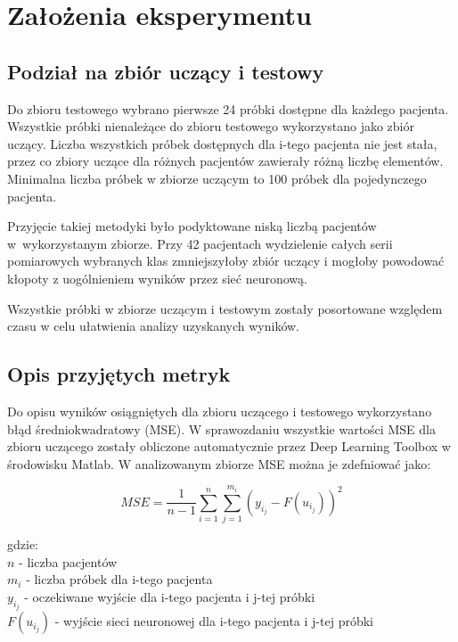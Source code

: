 \documentclass[12pt]{article}
\begin{document}
\newpage
\section{Założenia eksperymentu}

\subsection{Podział na zbiór uczący i testowy}
Do zbioru testowego wybrano pierwsze 24 próbki dostępne dla każdego pacjenta. Wszystkie próbki nienależące do zbioru testowego wykorzystano jako zbiór uczący. Liczba wszystkich próbek dostępnych dla i-tego pacjenta nie jest stała, przez co zbiory uczące dla różnych pacjentów zawierały różną liczbę elementów. Minimalna liczba próbek w zbiorze uczącym to 100 próbek dla pojedynczego pacjenta.
 
Przyjęcie takiej metodyki było podyktowane niską liczbą pacjentów w~wykorzystanym zbiorze. Przy 42 pacjentach wydzielenie całych serii pomiarowych wybranych klas zmniejszyłoby zbiór uczący i mogłoby powodować kłopoty z uogólnieniem wyników przez sieć neuronową.

Wszystkie próbki w zbiorze uczącym i testowym zostały posortowane względem czasu w celu ułatwienia analizy uzyskanych wyników.

\subsection{Opis przyjętych metryk}

Do opisu wyników osiągniętych dla zbioru uczącego i testowego wykorzystano błąd średniokwadratowy (MSE). W sprawozdaniu wszystkie wartości MSE dla zbioru uczącego zostały obliczone automatycznie przez Deep Learning Toolbox w środowisku Matlab. W analizowanym zbiorze MSE można je zdefniować jako:

\begin{equation}
 	MSE = \frac{1}{n-1} \sum_{i=1}^{n} \sum_{j=1}^{m_i} (y_{i_j} - F(u_{i_j}))^2
\end{equation}

\begin{flushleft}
 gdzie:\\
 $n$ - liczba pacjentów \\
 $m_i$ - liczba próbek dla i-tego pacjenta \\
 $y_{i_j}$ - oczekiwane wyjście dla i-tego pacjenta i j-tej próbki \\
 $F(u_{i_j})$ - wyjście sieci neuronowej dla i-tego pacjenta i j-tej próbki
\end{flushleft} 
\end{document}
